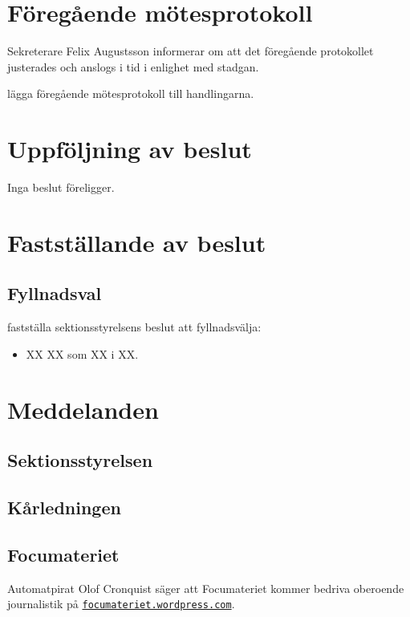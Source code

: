 \documentclass[hidelinks]{sektionsmote}
\begin{document}
\section{Föregående mötesprotokoll}
Sekreterare Felix Augustsson informerar om att det föregående protokollet justerades och anslogs i tid i enlighet med stadgan.
\begin{beslut}
    \item lägga föregående mötesprotokoll till handlingarna. 
\end{beslut}


\section{Uppföljning av beslut}
Inga beslut föreligger.


\section{Fastställande av beslut}
\subsection{Fyllnadsval}
\begin{beslut}
  \item fastställa sektionsstyrelsens beslut att fyllnadsvälja:
  \begin{itemize}
      \item XX XX som XX i XX.
  \end{itemize}
\end{beslut}


\section{Meddelanden}
\subsection{Sektionsstyrelsen}


\subsection{Kårledningen}


\subsection{Focumateriet}
Automatpirat Olof Cronquist säger att Focumateriet kommer bedriva oberoende journalistik på \newline\href{https://focumateriet.wordpress.com}{\texttt{focumateriet.wordpress.com}}.
\end{document}
